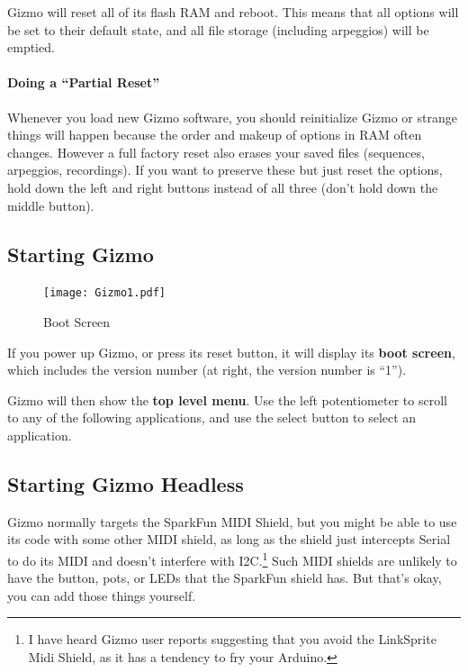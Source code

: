 \documentclass{article}
\begin{document}
Gizmo will reset all of its flash RAM and reboot.  This means that all options will be set to their default state, and all file storage (including arpeggios) will be emptied.

\paragraph{Doing a ``Partial Reset''} Whenever you load new Gizmo software, you should reinitialize Gizmo or strange things will happen because the order and makeup of options in RAM often changes.  However a full factory reset also erases your saved files (sequences, arpeggios, recordings).  If you want to preserve these but just reset the options, hold down the left and right buttons instead of all three (don't hold down the middle button).

\subsection{Starting Gizmo}

\begin{figure}
\vspace{-1.5em}\texttt{[image: Gizmo1.pdf]}
\vspace{-2em}\caption{\small Boot Screen}\vspace{-2em}
\label{BootScreen}
\end{figure}

If you power up Gizmo, or press its reset button, it will display its {\bf boot screen}, which includes the version number (at right, the version number is ``1'').

Gizmo will then show the {\bf top level menu}.  Use the left potentiometer to scroll to any of the following applications, and use the select button to select an application.  

\subsection{Starting Gizmo Headless}

Gizmo normally targets the SparkFun MIDI Shield, but you might be able to use its code with some other MIDI shield, as long as the shield just intercepts Serial to do its MIDI and doesn't interfere with I2C.\footnote{I have heard Gizmo user reports suggesting that you avoid the LinkSprite Midi Shield, as it has a tendency to fry your Arduino.}  Such MIDI shields are unlikely to have the button, pots, or LEDs that the SparkFun shield has.  But that's okay, you can add those things yourself.  
\end{document}
